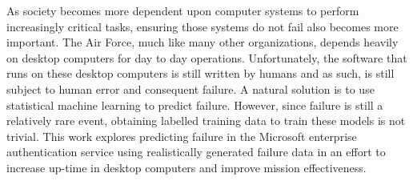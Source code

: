 As society becomes more dependent upon computer systems to perform increasingly
critical tasks, ensuring those systems do not fail also becomes more important.
The Air Force, much like many other organizations, depends heavily on desktop
computers for day to day operations. Unfortunately, the software that runs on
these desktop computers is still written by humans and as such, is still
subject to human error and consequent failure. A natural solution is to use
statistical machine learning to predict failure. However, since failure is
still a relatively rare event, obtaining labelled training data to train these
models is not trivial. This work explores predicting failure in the Microsoft
enterprise authentication service using realistically generated failure data in
an effort to increase up-time in desktop computers and improve mission
effectiveness.
